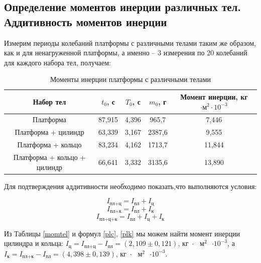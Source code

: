 \documentclass[a4paper,12pt]{article}
\begin{document}
	\subsection{Определение моментов инерции различных тел. Аддитивность моментов инерции}
	
	Измерим периоды колебаний платформы с различными телами таким же образом, как и для ненагруженной платформы, а именно -- 3 измерения по 20 колебаний для каждого набора тел, получаем:
	
	\begin{table}[!h]
		\begin{center}
			\begin{tabular}{|c|c|c|c|c|}
				\hline
				Набор тел & $t_0$, с & $T_0$, с & $m_0$, г & Момент инерции, кг$\cdot \text{м}^2 \cdot 10^{-3}$\\
				\hline
				Платформа& 87,915 & 4,396 & 965,7 & 7,446\\
				\hline
				Платформа + цилиндр  & 63,339 & 3,167 & 2387,6 & 9,555  \\
				\hline
				Платформа + кольцо   & 83,234 & 4,162 & 1713,7 & 11,844 \\
				\hline
				Платформа + кольцо + цилиндр &   66,641 & 3,332 & 3135,6 & 13,890 \\
				\hline
			\end{tabular}
		\caption{Моменты инерции платформы с различными телами}
		\label{momtel}
		\end{center}
	\end{table}
	
	Для подтверждения аддитивности необходимо показать,что выполняются условия:
	
	
		\begin{equation} \label{plc}
			I_\text{пл+ц} = I_\text{пл} + I_\text{ц}
		\end{equation}
		\begin{equation}\label{plk}
			I_\text{пл+к} = I_\text{пл} + I_\text{к}
		\end{equation}
		\begin{equation}
			I_\text{пл+ц+к} = I_\text{пл} + I_\text{ц} + I_\text{к}
			\label{plck}
		\end{equation}
	
	
	Из Таблицы \eqref{momtel} и формул \eqref{plc}, \eqref{plk} мы можем найти момент инерции цилиндра и кольца: $I_\text{ц} = I_\text{пл+ц} - I_\text{пл} = \left(2,109 \pm 0,121\right) \text{,  кг $\cdot$ $\text{м}^2$ $\cdot 10^{-3}$}$, а $I_\text{к} = I_\text{пл+к} - I_\text{пл} = \left(4,398 \pm 0,139\right) \text{,  кг $\cdot$ $\text{м}^2$ $\cdot 10^{-3}$}$. 
	
\end{document}
